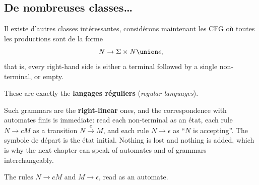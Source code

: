 \subsection{De nombreuses classes\dots}
Il existe d'autres classes intéressantes, considérons maintenant les CFG où
toutes les productions sont de la forme
\[
  N \to \Sigma \times N \union \epsilon ,
\]
that is, every right-hand side is either a terminal followed by a single
non-terminal, or empty.

\begin{theorem}
  These are exactly the \textbf{langages réguliers} (\textit{regular
  languages}).
\end{theorem}

\begin{remark}
  Such grammars are the \textbf{right-linear} ones, and the correspondence with
  automates finis is immediate: read each non-terminal as an état, each rule
  $N \to cM$ as a transition $N \xrightarrow{\,c\,} M$, and each rule
  $N \to \epsilon$ as ``$N$ is accepting''. The symbole de départ is the état
  initial. Nothing is lost and nothing is added, which is why the next chapter
  can speak of automates and of grammars interchangeably.
\end{remark}

\begin{figure}[h!]
  \centering
\end{figure}

\noindent The rules $N \to cM$ and $M \to \epsilon$, read as an automate.

